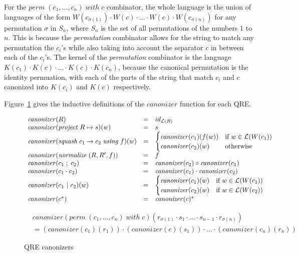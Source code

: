 \documentclass[acmsmall,review,anonymous]{acmart}
\newcommand{\kw}[1]{\ensuremath{\mathit{#1}}}
\newcommand{\project}[2]{\ensuremath{\kw{project} \; #1 \mapsto #2}}
\newcommand{\squash}[3]{\ensuremath{\kw{squash} \; #1 \rightarrow #2\; \kw{using} \; #3}}
\newcommand{\perm}[2]{\ensuremath{\kw{perm}\; (#1)\; \kw{with}\; #2}}
\newcommand{\normalize}[3]{\ensuremath{\kw{normalize} \; (#1, #2, #3)}}
\newcommand{\sep}{\ensuremath{\ | \ }}
\newcommand{\canonizer}{\ensuremath{\kw{canonizer}}}
\begin{document}
For the $\perm{c_1, \ldots, c_n}{c}$ combinator, the whole language is the
union of languages of the form $W(c_{\sigma(1)}) \cdot W(c) \cdot \ldots \cdot
W(c) \cdot W(c_{\sigma(n)})$ for any permutation $\sigma$ in $S_n$, where
$S_n$ is the set of all permutations of the numbers $1$ to $n$. This is because
the \textit{permutation} combinator allows for the string to match any
permutation the $c_i$'s while also taking into account the separator $c$ in
between each of the $c_i$'s. The kernel of the \textit{permutation} combinator
is the language $K(c_1) \cdot K(c) \cdot \ldots \cdot K(c) \cdot K(c_n)$,
because the canonical permutation is the identity permuation, with each of the
parts of the string that match $c_i$ and $c$ canonized into $K(c_i)$ and $K(c)$
respectively.

Figure~\ref{fig:canonizers} gives the inductive definitions of the
$\canonizer{}$ function for each QRE.
\begin{figure}[t]
\begin{center}
\[
\begin{array}{l@\quad l @\quad l}
\canonizer(R) &=& id_{\mathcal{L}(R)} \\
\canonizer(\project{R}{s})(w) &=& s\\
\canonizer(\squash{c_1}{c_2}{f})(w) &=&
\begin{cases}
\canonizer(c_1)(f(w)) & \text{if } w \in \mathcal{L}(W(c_1))\\
\canonizer(c_2)(w) & \text{otherwise}
\end{cases}\\
\canonizer(\normalize{R}{R'}{f}) &=& f\\
\canonizer(c_1 \; ; \; c_2) &=& \canonizer(c_2) \circ \canonizer(c_1)\\
\canonizer(c_1 \cdot c_2) &=& \canonizer(c_1) \cdot \canonizer(c_2)\\
\canonizer(c_1 \sep c_2)(w) &=&
\begin{cases}
\canonizer(c_1)(w) & \text{if } w \in \mathcal{L}(W(c_1))\\
\canonizer(c_2)(w) & \text{if } w \in \mathcal{L}(W(c_2))\\
\end{cases}\\
\canonizer(c^*) &=& \canonizer(c)^* \\
\end{array}
\]
\end{center}
\begin{align*}
&\canonizer(\perm{c_1, \ldots, c_n}{c})(r_{\sigma(1)}
\cdot s_1 \cdot \ldots \cdot s_{n-1} \cdot r_{\sigma(n)})\\
&= (\canonizer(c_1)(r_1)) \cdot (\canonizer(c)(s_1)) \cdot \ldots \cdot
(\canonizer(c_n)(r_n))
\end{align*}
\caption{QRE canonizers}
\label{fig:canonizers}
\end{figure}
\end{document}
